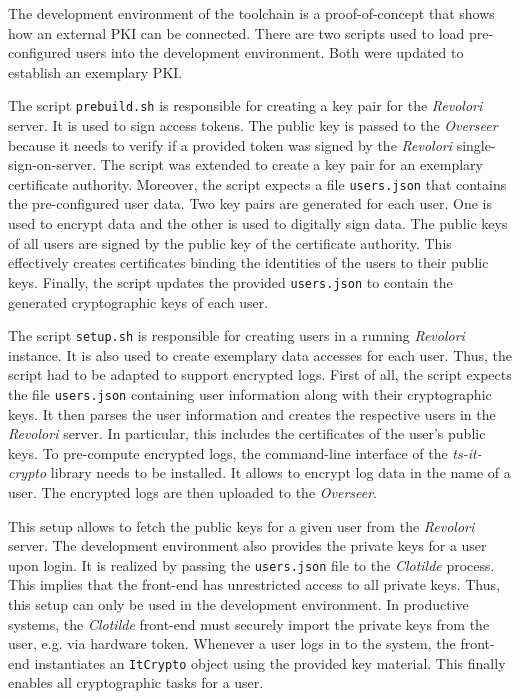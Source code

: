 \documentclass[../main.tex]{subfiles}
\begin{document}
The development environment of the toolchain is a proof-of-concept that shows how an external PKI can be connected.
There are two scripts used to load pre-configured users into the development environment.
Both were updated to establish an exemplary PKI.

The script \verb|prebuild.sh| is responsible for creating a key pair for the \emph{Revolori} server.
It is used to sign access tokens.
The public key is passed to the \emph{Overseer} because it needs to verify if a provided token was signed by the \emph{Revolori} single-sign-on-server.
The script was extended to create a key pair for an exemplary certificate authority.
Moreover, the script expects a file \verb|users.json| that contains the pre-configured user data.
Two key pairs are generated for each user.
One is used to encrypt data and the other is used to digitally sign data.
The public keys of all users are signed by the public key of the certificate authority.
This effectively creates certificates binding the identities of the users to their public keys.
Finally, the script updates the provided \verb|users.json| to contain the generated cryptographic keys of each user.

The script \verb|setup.sh| is responsible for creating users in a running \emph{Revolori} instance.
It is also used to create exemplary data accesses for each user.
Thus, the script had to be adapted to support encrypted logs.
First of all, the script expects the file \verb|users.json| containing user information along with their cryptographic keys.
It then parses the user information and creates the respective users in the \emph{Revolori} server.
In particular, this includes the certificates of the user's public keys.
To pre-compute encrypted logs, the command-line interface of the \emph{ts-it-crypto} library needs to be installed.
It allows to encrypt log data in the name of a user.
The encrypted logs are then uploaded to the \emph{Overseer}.

This setup allows to fetch the public keys for a given user from the \emph{Revolori} server.
The development environment also provides the private keys for a user upon login.
It is realized by passing the \verb|users.json| file to the \emph{Clotilde} process.
This implies that the front-end has unrestricted access to all private keys.
Thus, this setup can only be used in the development environment.
In productive systems, the \emph{Clotilde} front-end must securely import the private keys from the user, e.g. via hardware token.
Whenever a user logs in to the system, the front-end instantiates an \verb|ItCrypto| object using the provided key material.
This finally enables all cryptographic tasks for a user.
\end{document}
